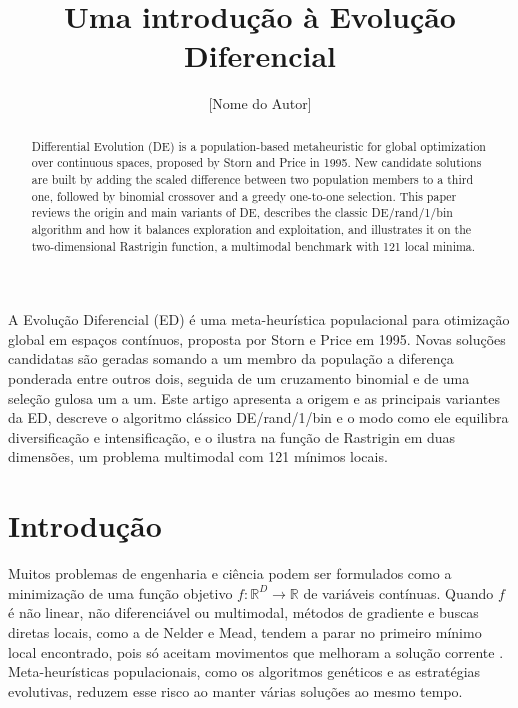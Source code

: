 \documentclass[12pt]{article}
\title{Uma introdução à Evolução Diferencial}
\author{[Nome do Autor]\inst{1}}
\begin{document}
\maketitle

\begin{abstract}
  Differential Evolution (DE) is a population-based metaheuristic for global
  optimization over continuous spaces, proposed by Storn and Price in 1995. New
  candidate solutions are built by adding the scaled difference between two
  population members to a third one, followed by binomial crossover and a
  greedy one-to-one selection. This paper reviews the origin and main variants
  of DE, describes the classic DE/rand/1/bin algorithm and how it balances
  exploration and exploitation, and illustrates it on the two-dimensional
  Rastrigin function, a multimodal benchmark with 121 local minima.
\end{abstract}

\begin{resumo}
  A Evolução Diferencial (ED) é uma meta-heurística populacional para
  otimização global em espaços contínuos, proposta por Storn e Price em 1995.
  Novas soluções candidatas são geradas somando a um membro da população a
  diferença ponderada entre outros dois, seguida de um cruzamento binomial e
  de uma seleção gulosa um a um. Este artigo apresenta a origem e as principais
  variantes da ED, descreve o algoritmo clássico DE/rand/1/bin e o modo como
  ele equilibra diversificação e intensificação, e o ilustra na função de
  Rastrigin em duas dimensões, um problema multimodal com 121 mínimos locais.
\end{resumo}

\section{Introdução}

Muitos problemas de engenharia e ciência podem ser formulados como a
minimização de uma função objetivo $f:\mathbb{R}^D \to \mathbb{R}$ de variáveis
contínuas. Quando $f$ é não linear, não diferenciável ou multimodal, métodos de
gradiente e buscas diretas locais, como a de Nelder e Mead, tendem a parar no
primeiro mínimo local encontrado, pois só aceitam movimentos que melhoram a
solução corrente \cite{storn1997}. Meta-heurísticas populacionais, como os
algoritmos genéticos e as estratégias evolutivas, reduzem esse risco ao manter
várias soluções ao mesmo tempo.
\end{document}
